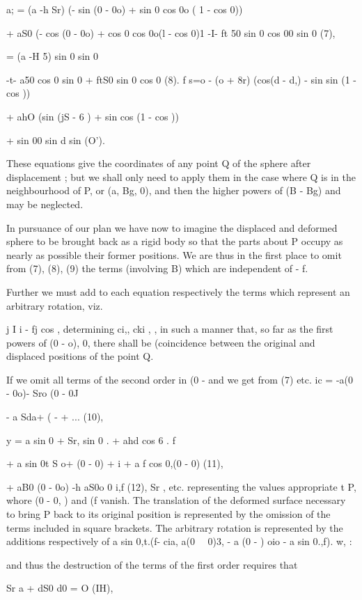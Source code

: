 a; = (a -h Sr) (- sin (0 - 0o) + sin 0 cos 0o ( 1 - cos 0))

+ aS0 (- cos (0 - 0o) + cos 0 cos 0o(l - cos 0)1 -I- ft 50 sin 0 cos 00 sin 0
(7),

 = (a -H 5) sin 0 sin 0

-t- a50 cos 0 sin 0 + ftS0 sin 0 cos 0 (8).  f s=o - (o + 8r) (cos(d - d,) -
sin  sin  (1 - cos ))

+ ahO (sin (jS - 6 ) + sin cos  (1 - cos  ))

+ sin 00 sin d sin  (O').

These equations give the coordinates of any point Q of the sphere after
displacement ; but we shall only need to apply them in the case where Q is in
the neighbourhood of P, or (a, Bg, 0), and then the higher powers of (B - Bg)
and  may be neglected.

In pursuance of our plan we have now to imagine the displaced and deformed
sphere to be brought back as a rigid body so that the parts about P occupy as
nearly as possible their former positions. We are thus in the first place to
omit from (7), (8), (9) the terms (involving B) which are independent of - f.

Further we must add to each equation respectively the terms which represent an
arbitrary rotation, viz.

j I i - fj cos ,
determining ci,, cki , , in such a manner that, so far as the first powers of
(0 - o), 0, there shall be (coincidence between the original and displaced
positions of the point Q.

If we omit all terms of the second order in (0 - and we get from (7) etc.  ic =
-a(0 - 0o)- Sro (0 - 0J

- a Sda+  ( - + ... (10),

y = a sin  0 + Sr, sin 0 . + ahd cos 6 . f

+ a sin 0t S o+ (0 - 0) + i + a  f cos 0,(0 - 0) (11),

+ aB0 (0 - 0o) -h aS0o 0 i,f (12), Sr , etc. representing the values
appropriate t  P, whore (0 - 0, ) and (f vanish. The translation of the
deformed surface necessary to bring P back to its original position is
represented by the omission of the terms included in square brackets. The
arbitrary rotation is represented by the additions respectively of a sin
0,t.(f- cia, a(0~~ 0)3, - a (0 - ) oio - a sin 0.,f). w, :

and thus the destruction of the terms of the first order requires that

Sr a + dS0 d0 = O (IH),


